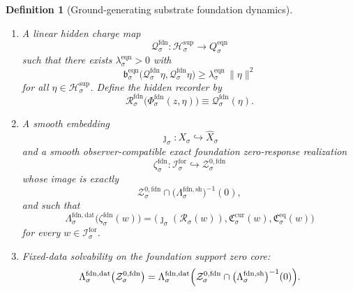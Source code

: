 \documentclass[11pt]{article}
\newcommand{\ForSpace}[1]{\mathcal I_{#1}^{\mathrm{for}}}
\newcommand{\Reduction}[1]{\mathcal R_{#1}}
\newcommand{\CurrentCarrier}[1]{\mathfrak C_{#1}^{\mathrm{cur}}}
\newcommand{\EqCarrier}[1]{\mathfrak C_{#1}^{\mathrm{eq}}}
\newcommand{\VisibleAffine}[1]{\widehat X_{#1}}
\newcommand{\SeedHidden}[1]{\mathcal H_{#1}^{\mathrm{sup}}}
\newcommand{\FoundData}[1]{\Lambda_{#1}^{\mathrm{fdn,dat}}}
\newcommand{\FoundShellMap}[1]{\Lambda_{#1}^{\mathrm{fdn,sh}}}
\newcommand{\FoundZeroCore}[1]{\mathcal Z_{#1}^{0,\mathrm{fdn}}}
\newcommand{\FoundSplit}[1]{\Phi_{#1}^{\mathrm{fdn}}}
\newcommand{\FoundCharge}[1]{\mathcal Q_{#1}^{\mathrm{fdn}}}
\newcommand{\FoundResidual}[1]{\mathcal R_{#1}^{\mathrm{fdn}}}
\newcommand{\FoundEmbed}[1]{\zeta_{#1}^{\mathrm{fdn}}}
\newcommand{\EqnTarget}[1]{Q_{#1}^{\mathrm{eqn}}}
\newcommand{\EqnPair}[1]{\mathfrak b_{#1}^{\mathrm{eqn}}}
\newtheorem{definition}{Definition}
\begin{document}
\begin{definition}[Ground-generating substrate foundation dynamics]
\begin{enumerate}
    \item A linear hidden charge map
    \[
    \FoundCharge{\sigma}:\SeedHidden{\sigma}\to\EqnTarget{\sigma}
    \]
    such that there exists \(\lambda_{\sigma}^{\mathrm{eqn}}>0\) with
    \begin{equation}
    \EqnPair{\sigma}\bigl(\FoundCharge{\sigma}\eta,\FoundCharge{\sigma}\eta\bigr)
    \ge
    \lambda_{\sigma}^{\mathrm{eqn}}\,
    \|\eta\|^{2}
    \label{eq:foundchargegap}
    \end{equation}
    for all \(\eta\in\SeedHidden{\sigma}\). Define the hidden recorder by
    \begin{equation}
    \FoundResidual{\sigma}\bigl(\FoundSplit{\sigma}(z,\eta)\bigr)
    \equiv
    \FoundCharge{\sigma}(\eta).
    \label{eq:foundresidual}
    \end{equation}

    \item A smooth embedding
    \[
    \jmath_{\sigma}:X_{\sigma}\hookrightarrow\VisibleAffine{\sigma}
    \]
    and a smooth observer-compatible exact foundation zero-response realization
    \[
    \FoundEmbed{\sigma}:\ForSpace{\sigma}\hookrightarrow\FoundZeroCore{\sigma}
    \]
    whose image is exactly
    \[
    \FoundZeroCore{\sigma}
    \cap
    \bigl(\FoundShellMap{\sigma}\bigr)^{-1}(0),
    \]
    and such that
    \begin{equation}
    \FoundData{\sigma}\bigl(\FoundEmbed{\sigma}(w)\bigr)
    =
    \bigl(
    \jmath_{\sigma}(\Reduction{\sigma}(w)),
    \CurrentCarrier{\sigma}(w),
    \EqCarrier{\sigma}(w)
    \bigr)
    \label{eq:foundcompat}
    \end{equation}
    for every \(w\in\ForSpace{\sigma}\).

    \item Fixed-data solvability on the foundation support zero core:
    \begin{equation}
    \FoundData{\sigma}\bigl(\FoundZeroCore{\sigma}\bigr)
    =
    \FoundData{\sigma}\Bigl(
    \FoundZeroCore{\sigma}\cap
    \bigl(\FoundShellMap{\sigma}\bigr)^{-1}(0)
    \Bigr).
    \label{eq:foundsolvability}
    \end{equation}


\end{enumerate}
\end{definition}
\end{document}
